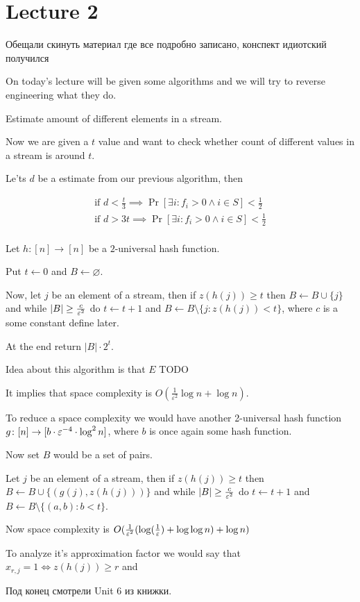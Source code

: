 
\section{Lecture 2}

Обещали скинуть материал где все подробно записано, конспект идиотский получился

On today's lecture will be given some algorithms and we will try to reverse engineering what they do.

Estimate amount of different elements in a stream.

Now we are given a $t$ value and want to check whether count of different values in a stream is around $t$.

Le'ts $d$ be a estimate from our previous algorithm, then

\begin{align*}
	\text{if } d < \frac t 3 \implies \Pr[\exists i \colon f_i > 0 \land i \in S] < \frac 1 2 \\
	\text{if } d > 3 t \implies \Pr[\exists i \colon f_i > 0 \land i \in S] < \frac 1 2 \\
\end{align*}


\begin{algorithm}
	Let $h \colon [n] \to [n]$ be a $2$-universal hash function.
	
	Put $t \gets 0$ and $B \gets \varnothing$.
	
	Now, let $j$ be an element of a stream, then if $z(h(j)) \geq t$ then $B \gets B \cup \{j\}$ and while $|B| \geq \frac {c} {\varepsilon^2}$ do $t \gets t + 1$ and $B \gets B \setminus \{j \colon z(h(j)) < t\}$, where $c$ is a some constant define later.
	
	At the end return $|B| \cdot 2^t$.
	
	Idea about this algorithm is that $E$ TODO
	
	It implies that space complexity is $O(\frac 1 {\varepsilon^2} \log n + \log n)$.
	
	To reduce a space complexity we would have another 2-universal hash function $g \colon [n] \to [b \cdot \varepsilon^{-4} \cdot \log^2 n]$, where $b$ is once again some hash function.
	
	Now set $B$ would be a set of pairs.
	
	Let $j$ be an element of a stream, then if $z(h(j)) \geq t$ then $B \gets B \cup \{(g(j), z(h(j)))\}$ and while $|B| \geq \frac {c} {\varepsilon^2}$ do $t \gets t + 1$ and $B \gets B \setminus \{(a, b) \colon b < t\}$.
	
	Now space complexity is $O(\frac 1 {\varepsilon^2} (\log(\frac 1 {\varepsilon}) + \log \log n) + \log n)$
	
	To analyze it's approximation factor we would say that $x_{r, j} = 1 \iff z(h(j)) \geq r$ and 
\end{algorithm}

Под конец смотрели Unit 6 из книжки.